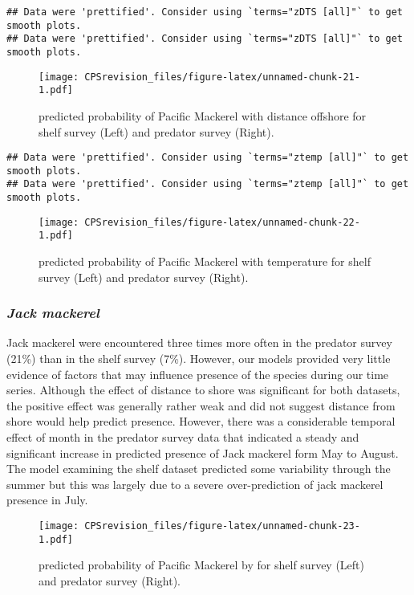 \documentclass[
]{article}
\begin{document}
\begin{verbatim}
## Data were 'prettified'. Consider using `terms="zDTS [all]"` to get smooth plots.
## Data were 'prettified'. Consider using `terms="zDTS [all]"` to get smooth plots.
\end{verbatim}

\begin{figure}
\centering
\texttt{[image: CPSrevision\_files/figure-latex/unnamed-chunk-21-1.pdf]}
\caption{predicted probability of Pacific Mackerel with distance
offshore for shelf survey (Left) and predator survey (Right).}
\end{figure}

\begin{verbatim}
## Data were 'prettified'. Consider using `terms="ztemp [all]"` to get smooth plots.
## Data were 'prettified'. Consider using `terms="ztemp [all]"` to get smooth plots.
\end{verbatim}

\begin{figure}
\centering
\texttt{[image: CPSrevision\_files/figure-latex/unnamed-chunk-22-1.pdf]}
\caption{predicted probability of Pacific Mackerel with temperature for
shelf survey (Left) and predator survey (Right).}
\end{figure}

\hypertarget{jack-mackerel-1}{%
\subsubsection{\texorpdfstring{\emph{Jack
mackerel}}{Jack mackerel}}\label{jack-mackerel-1}}

Jack mackerel were encountered three times more often in the predator
survey (21\%) than in the shelf survey (7\%). However, our models
provided very little evidence of factors that may influence presence of
the species during our time series. Although the effect of distance to
shore was significant for both datasets, the positive effect was
generally rather weak and did not suggest distance from shore would help
predict presence. However, there was a considerable temporal effect of
month in the predator survey data that indicated a steady and
significant increase in predicted presence of Jack mackerel form May to
August. The model examining the shelf dataset predicted some variability
through the summer but this was largely due to a severe over-prediction
of jack mackerel presence in July.

\begin{figure}
\centering
\texttt{[image: CPSrevision\_files/figure-latex/unnamed-chunk-23-1.pdf]}
\caption{predicted probability of Pacific Mackerel by for shelf survey
(Left) and predator survey (Right).}
\end{figure}
\end{document}
